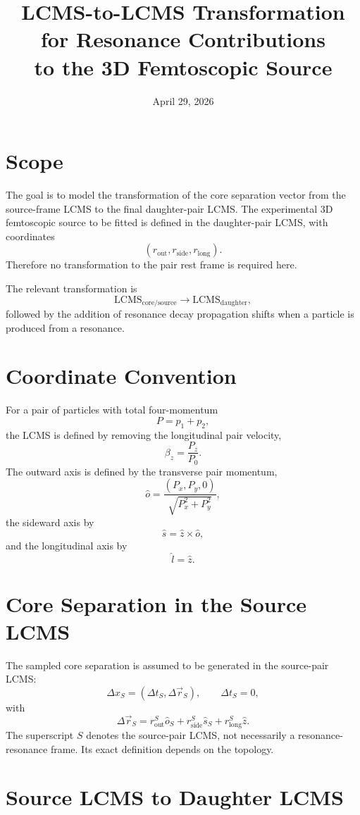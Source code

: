 \documentclass[11pt,a4paper]{article}
\title{LCMS-to-LCMS Transformation for Resonance Contributions\\to the 3D Femtoscopic Source}
\author{}
\date{April 29, 2026}
\begin{document}
\maketitle

\section{Scope}

The goal is to model the transformation of the core separation vector from the
source-frame LCMS to the final daughter-pair LCMS. The experimental 3D
femtoscopic source to be fitted is defined in the daughter-pair LCMS, with
coordinates
\[
  (r_{\mathrm{out}}, r_{\mathrm{side}}, r_{\mathrm{long}}).
\]
Therefore no transformation to the pair rest frame is required here.

The relevant transformation is
\[
  \mathrm{LCMS}_{\mathrm{core/source}}
  \rightarrow
  \mathrm{LCMS}_{\mathrm{daughter}},
\]
followed by the addition of resonance decay propagation shifts when a particle
is produced from a resonance.

\section{Coordinate Convention}

For a pair of particles with total four-momentum
\[
  P = p_1 + p_2,
\]
the LCMS is defined by removing the longitudinal pair velocity,
\[
  \beta_z = \frac{P_z}{P_0}.
\]
The outward axis is defined by the transverse pair momentum,
\[
  \hat{o} =
  \frac{(P_x, P_y, 0)}
       {\sqrt{P_x^2 + P_y^2}},
\]
the sideward axis by
\[
  \hat{s} = \hat{z} \times \hat{o},
\]
and the longitudinal axis by
\[
  \hat{l} = \hat{z}.
\]

\section{Core Separation in the Source LCMS}

The sampled core separation is assumed to be generated in the source-pair LCMS:
\[
  \Delta x_S =
  \left(
    \Delta t_S,
    \Delta \vec{r}_S
  \right),
  \qquad
  \Delta t_S = 0,
\]
with
\[
  \Delta \vec{r}_S =
  r_{\mathrm{out}}^S \hat{o}_S
  + r_{\mathrm{side}}^S \hat{s}_S
  + r_{\mathrm{long}}^S \hat{z}.
\]
The superscript \(S\) denotes the source-pair LCMS, not necessarily a
resonance-resonance frame. Its exact definition depends on the topology.

\section{Source LCMS to Daughter LCMS}
\end{document}
